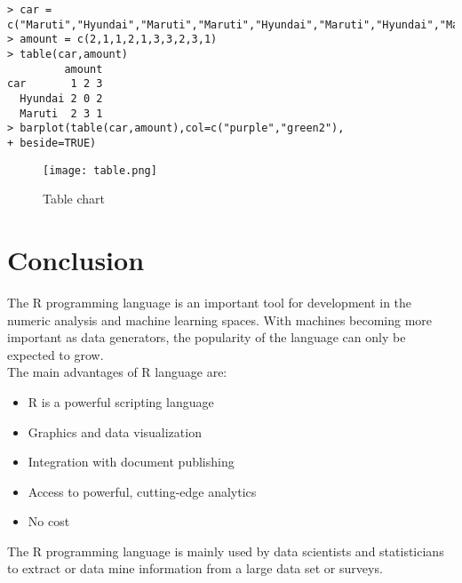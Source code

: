 \documentclass{article}
\begin{document}
\begin{lstlisting}[frame=single ]
> car = c("Maruti","Hyundai","Maruti","Maruti","Hyundai","Maruti","Hyundai","Maruti","Hyundai","Maruti")
> amount = c(2,1,1,2,1,3,3,2,3,1)
> table(car,amount)
         amount
car       1 2 3
  Hyundai 2 0 2
  Maruti  2 3 1
> barplot(table(car,amount),col=c("purple","green2"),
+ beside=TRUE)

\end{lstlisting}

\begin{figure}[h!]
\texttt{[image: table.png]}
  \centering
  \caption{Table chart}
  \label{fig:barchart1}
\end{figure}


\section{Conclusion}

The R programming language is an important tool for development in the numeric analysis and machine learning spaces. With machines becoming more important as data generators, the popularity of the language can only be expected to grow.\\

The main advantages of R language are:\\
\begin{itemize}
\item R is a powerful scripting language
\item Graphics and data visualization
\item Integration with document publishing
\item Access to powerful, cutting-edge analytics
\item No cost

\end{itemize}

The R programming language is mainly used by data scientists and statisticians to extract or data mine information from a large data set or surveys.
\end{document}
